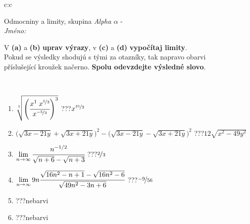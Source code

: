 \documentclass[10pt]{report}
\begin{document}
\thispagestyle{empty}
\begin{tabular}{c:c}
\begin{minipage}[c][104.5mm][t]{0.5\linewidth}
\begin{center}
\vspace{7mm}
{\huge Odmocniny a limity, skupina \textit{Alpha $\alpha$} -}\\[5mm]
\textit{Jméno:}\phantom{xxxxxxxxxxxxxxxxxxxxxxxxxxxxxxxxxxxxxxxxxxxxxxxxxxxxxxxxxxxxxxxxx}\\[5mm]
\begin{minipage}{0.95\linewidth}
\begin{center}
V \textbf{(a)} a \textbf{(b)} \textbf{uprav výrazy}, v \textbf{(c)} a \textbf{(d)} \textbf{vypočítaj limity}.\\Pokud se výsledky shodujú s tými za otazníky, tak napravo obarvi\\příslušející kroužek načerno. \textbf{Spolu odevzdejte výsledné slovo}.
\end{center}
\end{minipage}
\\[1mm]
\begin{minipage}{0.79\linewidth}
\begin{center}
\begin{varwidth}{\linewidth}
\begin{enumerate}
\small
\item $\sqrt[1]{\left(\cfrac{x^{1}\;x^{\nicefrac{5}{2}}}{x^{\nicefrac{-5}{3}}}\right)^{3}}$\quad \dotfill\; ???\;\dotfill \quad $x^{\nicefrac{31}{2}}$
\item {\footnotesize{\scriptsize$\big(\sqrt{3x-21y}+\sqrt{3x+21y}\big)^2-\big(\sqrt{3x-21y}-\sqrt{3x+21y}\big)^2$}\quad \dotfill\; ???\;\dotfill \quad $12\sqrt{x^2-49y^2}$}
\item $\lim\limits_{n\to\infty}\cfrac{n^{-1/2}}{\sqrt{n+6}-\sqrt{n+3}}$\quad \dotfill\; ???\;\dotfill \quad $\nicefrac{2}{3}$
\item $\lim\limits_{n\to\infty}9n\cfrac{\sqrt{16n^2-n+1}-\sqrt{16n^2-6}}{\sqrt{49n^2-3n+6}}$\quad \dotfill\; ???\;\dotfill \quad $\nicefrac{-9}{56}$
\item \quad \dotfill\; ???\;\dotfill \quad nebarvi
\item \quad \dotfill\; ???\;\dotfill \quad nebarvi
\end{enumerate}
\end{varwidth}
\end{center}
\end{minipage}
\begin{minipage}{0.20\linewidth}

\end{minipage}
\end{center}
\end{minipage}
\end{tabular}
\end{document}

